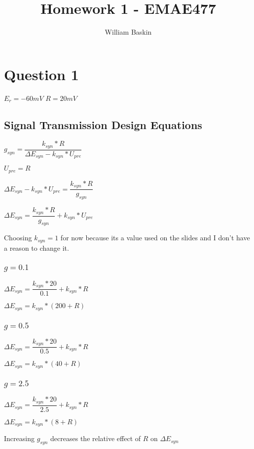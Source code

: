 \documentclass[12pt, letterpaper, oneside, notitlepage, onecolumn]{article}
\author{William Baskin}
\title{Homework 1 - EMAE477}
\begin{document}
\maketitle

\section*{Question 1}


$E_{r} = -60mV$
$R = 20mV$

\subsection{Signal Transmission Design Equations}

$g_{syn} = \dfrac{k_{syn} * R}{\Delta E_{syn} - k_{syn} * U_{pre}}$

$U_{pre} = R$

$\Delta E_{syn} - k_{syn} * U_{pre} = \dfrac{k_{syn} * R}{g_{syn}}$

$\Delta E_{syn} = \dfrac{k_{syn} * R}{g_{syn}} + k_{syn} * U_{pre}$

Choosing $k_{syn} = 1$ for now because its a value used on the slides and I
don't have a reason to change it. 

\subsubsection{$g = 0.1$}

$\Delta E_{syn} = \dfrac{k_{syn} * 20}{0.1} + k_{syn} * R$

$\Delta E_{syn} = k_{syn} * (200 + R)$

\subsubsection{$g = 0.5$}

$\Delta E_{syn} = \dfrac{k_{syn} * 20}{0.5} + k_{syn} * R$

$\Delta E_{syn} = k_{syn} * (40 + R)$

\subsubsection{$g = 2.5$}

$\Delta E_{syn} = \dfrac{k_{syn} * 20}{2.5} + k_{syn} * R$

$\Delta E_{syn} = k_{syn} * (8 + R)$

Increasing $g_{syn}$ decreases the relative effect of $R$ on $\Delta E_{syn}$
\end{document}
